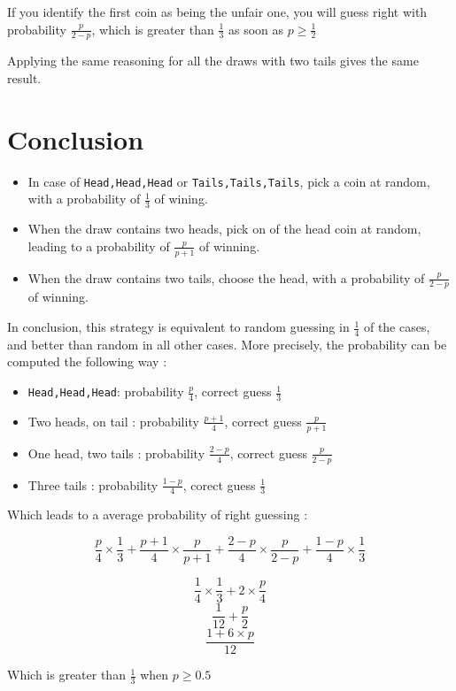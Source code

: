 \documentclass[11pt]{article}
\begin{document}
If you identify the first coin as being the unfair one, you will guess right with probability  $\frac{p}{2-p}$, which is greater than $\frac{1}{3}$ as soon as $p\ge \frac{1}{2}$

Applying the same reasoning for all the draws with two tails gives the same result. 

\section*{Conclusion}
\begin{itemize}
\item In case of {\tt Head,Head,Head} or {\tt Tails,Tails,Tails}, pick a coin at random, with a probability of $\frac{1}{3}$ of wining. 
\item When the draw contains two heads, pick on of the head coin at random, leading to a probability of  $\frac{p}{p+1}$ of winning.
\item When the draw contains two tails, choose the head, with a probability of $\frac{p}{2-p}$ of winning. 
\end{itemize}

In conclusion, this strategy is equivalent to random guessing in $\frac{1}{4}$ of the cases, and better than random in all other cases. More precisely, the probability can be computed the following way : 
\begin{itemize}
\item {\tt Head,Head,Head}:  probability $\frac{p}{4}$, correct guess $\frac{1}{3}$
\item Two heads, on tail : probability $\frac{p+1}{4}$, correct guess $\frac{p}{p+1}$
\item One head, two tails : probability  $\frac{2-p}{4}$, correct guess $\frac{p}{2-p}$
\item Three tails : probability $\frac{1-p}{4}$, corect guess $\frac{1}{3}$
\end{itemize}

Which leads to a average probability of right guessing : 

$$\frac{p}{4}\times \frac{1}{3} +\frac{p+1}{4}\times \frac{p}{p+1} +\frac{2-p}{4}\times \frac{p}{2-p}+\frac{1-p}{4}\times  \frac{1}{3}$$

$$\frac{1}{4}\times \frac{1}{3}+2\times \frac{p}{4}$$
$$\frac{1}{12}+\frac{p}{2}$$
$$\frac{1+6\times p}{12}$$

Which is greater than $\frac{1}{3}$ when $p\geq 0.5$



 
 
 
\end{document}
